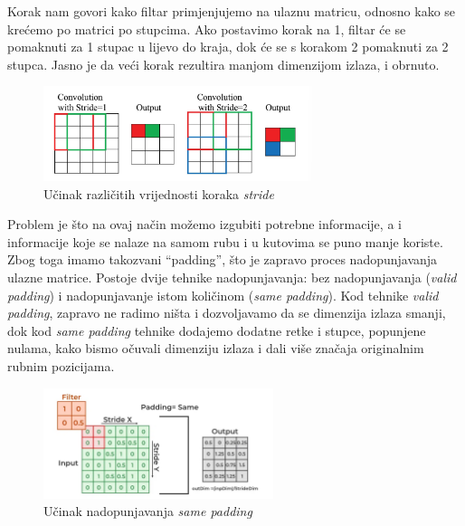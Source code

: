 Korak nam govori kako filtar primjenjujemo na ulaznu matricu, odnosno kako se krećemo po matrici po stupcima.
Ako postavimo korak na 1, filtar će se pomaknuti za 1 stupac u lijevo do kraja, dok će se s korakom 2 pomaknuti za 2 stupca.
Jasno je da veći korak rezultira manjom dimenzijom izlaza, i obrnuto.
\FloatBarrier
\begin{figure}[h]
    \centering
    \includegraphics[width=0.7\textwidth]{images/Stride}
    \caption{Učinak različitih vrijednosti koraka \emph{stride}
    \protect\footnotemark}
    \label{fig:slika14}
\end{figure}
\FloatBarrier
{}


Problem je što na ovaj način možemo izgubiti potrebne informacije, a i informacije koje se nalaze na samom rubu i u kutovima se puno manje koriste.
Zbog toga imamo takozvani \enquote{padding}, što je zapravo proces nadopunjavanja ulazne matrice.
Postoje dvije tehnike nadopunjavanja: bez nadopunjavanja (\emph{valid padding}) i nadopunjavanje istom količinom (\emph{same padding}).
Kod tehnike \emph{valid padding}, zapravo ne radimo ništa i dozvoljavamo da se dimenzija izlaza smanji, dok kod \emph{same padding} tehnike dodajemo dodatne retke i stupce, popunjene nulama, kako bismo očuvali dimenziju izlaza i dali više značaja originalnim rubnim pozicijama.

\FloatBarrier
\begin{figure}[h]
    \centering
    \includegraphics[width=0.6\textwidth]{images/Padding}
    \caption{Učinak nadopunjavanja \emph{same padding}
    \protect\footnotemark}
    \label{fig:slika15}
\end{figure}
\FloatBarrier
{}


